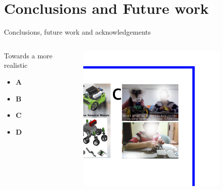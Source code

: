 \section{Conclusions and Future work}

{
\begin{frame}{Conclusions, future work and acknowledgements}

  \begin{columns}
    \begin{column}{.3\linewidth}
      Towards a more realistic
  \begin{itemize}
    \item \textbf{A}
    \item \textbf{B}
    \item \textbf{C}
    \item \textbf{D}
  \end{itemize}

    \end{column}


  \begin{column}{.6\linewidth}

      \begin{figure}
        \centering
        \includegraphics[width=0.9\textwidth]{./figures/future-work/versions/drawing-v00.png}
      \end{figure}

    \end{column}
  \end{columns}

\end{frame}
}


